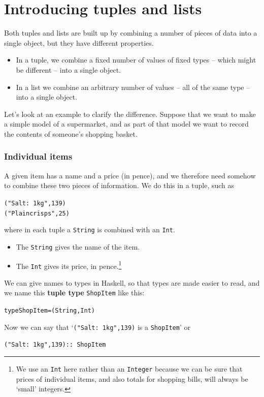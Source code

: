 \section{Introducing tuples and lists}

Both tuples and lists are built up by combining a number of pieces of data 
into a single object, but they have different properties. 
\begin{itemize}
\item
In a tuple, we
combine a fixed number of values of fixed types -- which might be 
different --
into a single object. 
\item
In a list we combine an arbitrary number of values
-- all of the same type -- into a single object. 
\end{itemize}
Let's look at an example to clarify the 
difference. Suppose that we want to
make a simple model of a supermarket, and as part of that model
we want to record the contents of someone's shopping basket.

\subsubsection*{Individual items}

A given item has a name and a price (in pence), and we therefore need somehow to 
combine these two pieces of information. We do this in a tuple,
such as
\begin{alltt}
("Salt:\ 1kg",139)
("Plain crisps",25)
\end{alltt}
where in each tuple a \texttt{String} is combined with an \texttt{Int}.
\begin{itemize}
\item
The \texttt{String} gives the name of the item.
\item
The \texttt{Int} gives its price, in pence.\footnote{We use an \texttt{Int} here rather than an \texttt{Integer} because we can be sure that prices of individual items, and also totals for shopping bills, will always be `small' integers.}
\end{itemize}
We can give names to types in Haskell, so that types are made easier to
read, and we name this \textbf{tuple type} \texttt{ShopItem} like this:
\begin{alltt}
type ShopItem = (String,Int)
\end{alltt}
Now we can say that `\texttt{("Salt:\ 1kg",139)} is a \texttt{ShopItem}' or
\begin{alltt}
("Salt:\ 1kg",139) ::\ ShopItem
\end{alltt}

